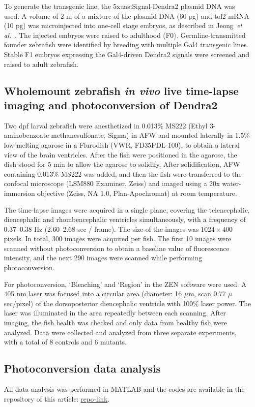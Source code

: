 \documentclass[fleqn]{wlscirep}
\begin{document}
To generate the transgenic line, the 5xuas:Signal-Dendra2 plasmid DNA was used.
A volume of 2 nl of a mixture of the plasmid DNA (60 pg) and tol2 mRNA (10 pg) was microinjected into one-cell stage embryos,
as described in Jeong~\emph{et al.}~\cite{Jeong2024TheZebrafish}. The injected embryos were raised to adulthood (F0).
Germline-transmitted founder zebrafish were identified by breeding with multiple Gal4 transgenic lines. Stable F1 embryos expressing the Gal4-driven Dendra2 signals were screened and raised to adult zebrafish.

\subsection*{Wholemount zebrafish \emph{in vivo} live time-lapse imaging and photoconversion of Dendra2}
Two dpf larval zebrafish were anesthetized in 0.013\% MS222 (Ethyl 3-aminobenzoate methanesulfonate, Sigma) in AFW and mounted laterally in 1.5\% low melting agarose in a Flurodish (VWR, FD35PDL-100),
to obtain a lateral view of the brain ventricles. After the fish were positioned in the agarose, the dish stood for 5 min to allow the agarose to solidify.
After solidification, AFW containing 0.013\% MS222 was added, and then the fish were transferred to the confocal microscope (LSM880 Examiner, Zeiss)
and imaged using a 20x water-immersion objective (Zeiss, NA 1.0, Plan-Apochromat) at room temperature.

The time-lapse images were acquired in a single plane, covering the telencephalic, diencephalic and rhombencephalic ventricles simultaneously,
with a frequency of 0.37--0.38 Hz (2.60--2.68 sec / frame). The size of the images was $1024\times400$ pixels. In total, 300 images were acquired per fish.
The first 10 images were scanned without photoconversion to obtain a baseline value of fluorescence intensity, and the next 290 images were scanned while performing photoconversion. 

For photoconversion, ‘Bleaching’ and ‘Region’ in the ZEN software were used. A 405 nm laser was focused into a circular area (diameter: 16 $\mu$m, scan 0.77 $\mu$sec/pixel)
of the dorsoposterior diencephalic ventricle with 100\% laser power. The laser was illuminated in the area repeatedly between each scanning.
After imaging, the fish health was checked and only data from healthy fish were analyzed.
Data were collected and analyzed from three separate experiments, with a total of 8 controls and 6 mutants.

\subsection*{Photoconversion data analysis}
All data analysis was performed in MATLAB and the codes are available in the repository of this article: \url{repo-link}.
\end{document}

